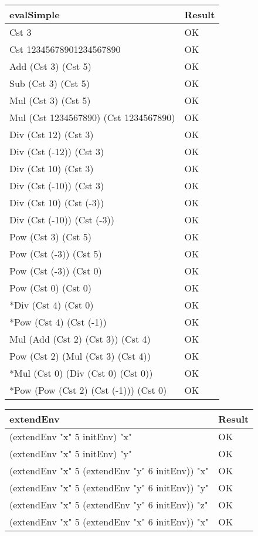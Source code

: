 \documentclass[12pt,a4paper]{article}
\begin{document}
\begin{tabularx}{\linewidth}[!htbp]{X|l}
 \textbf{evalSimple} & Result \\
 \hline
    Cst 3 & OK \\
    \hline
    Cst 12345678901234567890 & OK \\
    \hline
    Add (Cst 3) (Cst 5) & OK \\
    \hline
    Sub (Cst 3) (Cst 5) & OK \\
    \hline
    Mul (Cst 3) (Cst 5) & OK \\
    \hline
    Mul (Cst 1234567890) (Cst 1234567890)& OK \\
    \hline
    Div (Cst 12) (Cst 3) & OK \\
    \hline
    Div (Cst (-12)) (Cst 3) & OK \\
    \hline
    Div (Cst 10) (Cst 3) & OK \\
    \hline
    Div (Cst (-10)) (Cst 3) & OK \\
    \hline
    Div (Cst 10) (Cst (-3)) & OK \\
    \hline
    Div (Cst (-10)) (Cst (-3)) & OK \\
    \hline
    Pow (Cst 3) (Cst 5) & OK \\
    \hline
    Pow (Cst (-3)) (Cst 5) & OK \\
    \hline
    Pow (Cst (-3)) (Cst 0) & OK \\
    \hline
    Pow (Cst 0) (Cst 0) & OK \\
    \hline
    *Div (Cst 4) (Cst 0) & OK \\
    \hline
    *Pow (Cst 4) (Cst (-1)) & OK \\
    \hline
    Mul (Add (Cst 2) (Cst 3)) (Cst 4) & OK \\
    \hline
    Pow (Cst 2) (Mul (Cst 3) (Cst 4)) & OK \\
    \hline
    *Mul (Cst 0) (Div (Cst 0) (Cst 0)) & OK \\
    \hline
    *Pow (Pow (Cst 2) (Cst (-1))) (Cst 0) & OK \\
     \hline
\end{tabularx}


\begin{tabularx}{\linewidth}[!htbp]{X|l}
 \textbf{extendEnv} & Result \\
 \hline
    (extendEnv "x" 5 initEnv) "x" & OK \\
    \hline
    (extendEnv "x" 5 initEnv) "y" & OK \\
    \hline
    (extendEnv "x" 5 (extendEnv "y" 6 initEnv)) "x" & OK \\
    \hline
    (extendEnv "x" 5 (extendEnv "y" 6 initEnv)) "y" & OK \\
    \hline
    (extendEnv "x" 5 (extendEnv "y" 6 initEnv)) "z" & OK \\
    \hline
    (extendEnv "x" 5 (extendEnv "x" 6 initEnv)) "x" & OK \\
     \hline
\end{tabularx}
\end{document}
